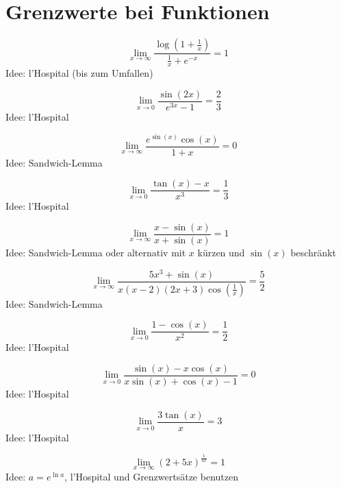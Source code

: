 \section{Grenzwerte bei Funktionen}
\begin{displaymath}
  \lim_{x \to \infty} \frac{\log\left(1 + \frac{1}{x}\right)}{\frac{1}{x} + e^{-x}} = 1
\end{displaymath}
Idee: l'Hospital (bis zum Umfallen)

\begin{displaymath}
  \lim_{x \to 0} \frac{\sin(2x)}{e^{3x} - 1} = \frac{2}{3}
\end{displaymath}
Idee: l'Hospital

\begin{displaymath}
  \lim_{x \to \infty} \frac{e^{\sin(x)}\cos(x)}{1+x} = 0
\end{displaymath}
Idee: Sandwich-Lemma

\begin{displaymath}
  \lim_{x \to 0} \frac{\tan(x)-x}{x^3} = \frac{1}{3}
\end{displaymath}
Idee: l'Hospital

\begin{displaymath}
  \lim_{x \to \infty} \frac{x-\sin(x)}{x + \sin(x)} = 1
\end{displaymath}
Idee: Sandwich-Lemma oder alternativ mit $x$ kürzen und $\sin(x)$ beschränkt

\begin{displaymath}
  \lim_{x \to \infty} \frac{5x^3 +\sin(x)}{x(x-2)(2x+3)\cos\left(\frac{1}{x}\right)} = \frac{5}{2}
\end{displaymath}
Idee: Sandwich-Lemma

\begin{displaymath}
  \lim_{x \to 0} \frac{1 - \cos(x)}{x^2} = \frac{1}{2}
\end{displaymath}
Idee: l'Hospital

\begin{displaymath}
  \lim_{x \to 0} \frac{\sin(x) - x\cos(x)}{x\sin(x)+\cos(x) - 1} = 0
\end{displaymath}
Idee: l'Hospital

\begin{displaymath}
  \lim_{x \to 0} \frac{3 \tan(x)}{x} = 3
\end{displaymath}
Idee: l'Hospital

\begin{displaymath}
  \lim_{x \to \infty} \left(2+5x\right)^{\frac{1}{4x}} = 1
\end{displaymath}
Idee: $a = e^{\ln a}$, l'Hospital und Grenzwertsätze benutzen

